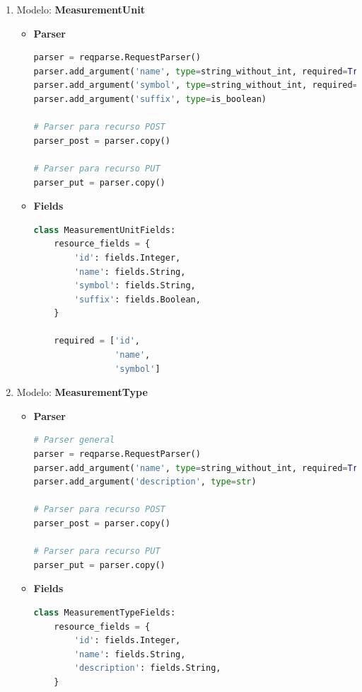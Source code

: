\documentclass[a4paper,12pt]{article}
\begin{document}
\begin{enumerate}
\begin{itemize}
\end{itemize}

\item Modelo: \textbf{MeasurementUnit}

\begin{itemize}
	\item \textbf{Parser}
	
\begin{lstlisting}[language=Python]
parser = reqparse.RequestParser()
parser.add_argument('name', type=string_without_int, required=True)
parser.add_argument('symbol', type=string_without_int, required=True)
parser.add_argument('suffix', type=is_boolean)

# Parser para recurso POST
parser_post = parser.copy()

# Parser para recurso PUT
parser_put = parser.copy()
\end{lstlisting}

	\item \textbf{Fields}
	
\begin{lstlisting}[language=Python]
class MeasurementUnitFields:
    resource_fields = {
        'id': fields.Integer,
        'name': fields.String,
        'symbol': fields.String,
        'suffix': fields.Boolean,
    }

    required = ['id',
                'name',
                'symbol']
\end{lstlisting}

\end{itemize}

\item Modelo: \textbf{MeasurementType}

\begin{itemize}
	\item \textbf{Parser}
	
\begin{lstlisting}[language=Python]
# Parser general
parser = reqparse.RequestParser()
parser.add_argument('name', type=string_without_int, required=True)
parser.add_argument('description', type=str)

# Parser para recurso POST
parser_post = parser.copy()

# Parser para recurso PUT
parser_put = parser.copy()
\end{lstlisting}

	\item \textbf{Fields}
	
\begin{lstlisting}[language=Python]
class MeasurementTypeFields:
    resource_fields = {
        'id': fields.Integer,
        'name': fields.String,
        'description': fields.String,
    }


\end{lstlisting}
\end{itemize}
\end{enumerate}
\end{document}
